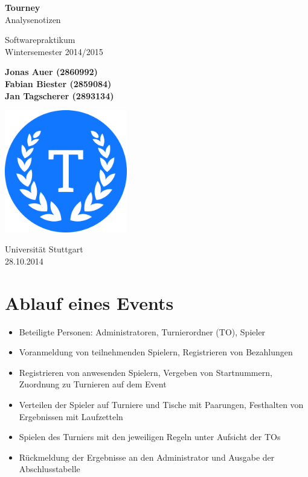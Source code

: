 \documentclass[11pt]{article}
\begin{document}
\begin{titlepage}
	\begin{center}
		\vspace*{1cm}

		\Huge
		\textbf{Tourney}\\
		Analysenotizen

		\vspace{0.5cm}
		\LARGE
		Softwarepraktikum\\
		\Large
		Wintersemester 2014/2015

		\vspace{1.5cm}

		\large
		\textbf{Jonas Auer (2860992)\\
				 Fabian Biester (2859084)\\
				 Jan Tagscherer (2893134)}

		\vfill

		\includegraphics[width=0.4\textwidth]{../Logo.png}

		\vspace{1.5cm}

		\Large
		Universität Stuttgart\\
		28.10.2014
	\end{center}
\end{titlepage}

\newpage

\section{Ablauf eines Events}

\begin{itemize}
	\item Beteiligte Personen: Administratoren, Turnierordner (TO), Spieler
	\item Voranmeldung von teilnehmenden Spielern, Registrieren von Bezahlungen
	\item Registrieren von anwesenden Spielern, Vergeben von Startnummern, Zuordnung zu Turnieren auf dem Event
	\item Verteilen der Spieler auf Turniere und Tische mit Paarungen, Festhalten von Ergebnissen mit Laufzetteln
	\item Spielen des Turniers mit den jeweiligen Regeln unter Aufsicht der TOs
	\item Rückmeldung der Ergebnisse an den Administrator und Ausgabe der Abschlusstabelle
\end{itemize}
\end{document}
